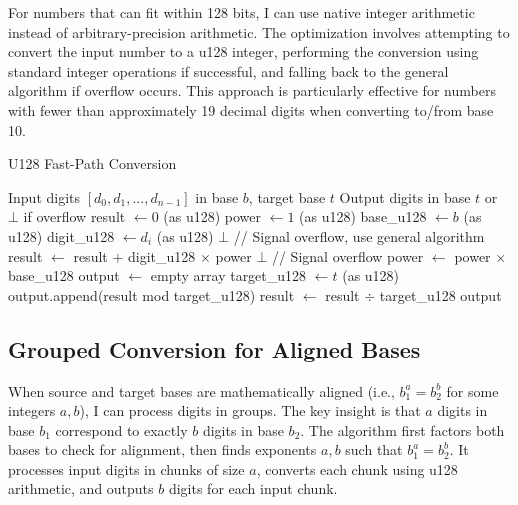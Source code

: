 \documentclass[10pt]{article}
\begin{document}
For numbers that can fit within 128 bits, I can use native integer arithmetic instead of arbitrary-precision arithmetic. The optimization involves attempting to convert the input number to a u128 integer, performing the conversion using standard integer operations if successful, and falling back to the general algorithm if overflow occurs. This approach is particularly effective for numbers with fewer than approximately 19 decimal digits when converting to/from base 10.

\begin{algorithm}
\caption{U128 Fast-Path Conversion}
\begin{algorithmic}[1]
\REQUIRE Input digits $[d_0, d_1, ..., d_{n-1}]$ in base $b$, target base $t$
\ENSURE Output digits in base $t$ or $\bot$ if overflow
\STATE result $\gets 0$ (as u128)
\STATE power $\gets 1$ (as u128)
\STATE base\_u128 $\gets b$ (as u128)
  \STATE digit\_u128 $\gets d_i$ (as u128)
    \RETURN $\bot$ // Signal overflow, use general algorithm
  \ENDIF
  \STATE result $\gets$ result $+$ digit\_u128 $\times$ power
    \RETURN $\bot$ // Signal overflow
  \ENDIF
  \STATE power $\gets$ power $\times$ base\_u128
\ENDFOR
\STATE output $\gets$ empty array
\STATE target\_u128 $\gets t$ (as u128)
  \STATE output.append(result mod target\_u128)
  \STATE result $\gets$ result $\div$ target\_u128
\ENDWHILE
\RETURN output
\end{algorithmic}
\end{algorithm}

\subsection{Grouped Conversion for Aligned Bases}

When source and target bases are mathematically aligned (i.e., $b_1^a = b_2^b$ for some integers $a, b$), I can process digits in groups. The key insight is that $a$ digits in base $b_1$ correspond to exactly $b$ digits in base $b_2$. The algorithm first factors both bases to check for alignment, then finds exponents $a, b$ such that $b_1^a = b_2^b$. It processes input digits in chunks of size $a$, converts each chunk using u128 arithmetic, and outputs $b$ digits for each input chunk.
\end{document}
